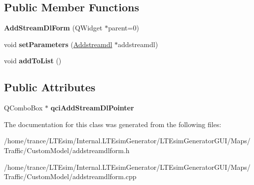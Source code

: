 \subsection*{Public Member Functions}
\begin{DoxyCompactItemize}
\item 
{\bfseries Add\+Stream\+Dl\+Form} (Q\+Widget $\ast$parent=0)\hypertarget{class_add_stream_dl_form_afa2a85a80f61b04969d082ffef72b9f1}{}\label{class_add_stream_dl_form_afa2a85a80f61b04969d082ffef72b9f1}

\item 
void {\bfseries set\+Parameters} (\hyperlink{class_addstreamdl}{Addstreamdl} $\ast$addstreamdl)\hypertarget{class_add_stream_dl_form_a182d398de3c7aa2993fc536286c7623b}{}\label{class_add_stream_dl_form_a182d398de3c7aa2993fc536286c7623b}

\item 
void {\bfseries add\+To\+List} ()\hypertarget{class_add_stream_dl_form_a15cc2397367ff0fca3631b2c558a7ff7}{}\label{class_add_stream_dl_form_a15cc2397367ff0fca3631b2c558a7ff7}

\end{DoxyCompactItemize}
\subsection*{Public Attributes}
\begin{DoxyCompactItemize}
\item 
Q\+Combo\+Box $\ast$ {\bfseries qci\+Add\+Stream\+Dl\+Pointer}\hypertarget{class_add_stream_dl_form_a8820b6721a1a8f0790085c0fade5421a}{}\label{class_add_stream_dl_form_a8820b6721a1a8f0790085c0fade5421a}

\end{DoxyCompactItemize}


The documentation for this class was generated from the following files\+:\begin{DoxyCompactItemize}
\item 
/home/trance/\+L\+T\+Esim/\+Internal.\+L\+T\+Esim\+Generator/\+L\+T\+Esim\+Generator\+G\+U\+I/\+Maps/\+Traffic/\+Custom\+Model/addstreamdlform.\+h\item 
/home/trance/\+L\+T\+Esim/\+Internal.\+L\+T\+Esim\+Generator/\+L\+T\+Esim\+Generator\+G\+U\+I/\+Maps/\+Traffic/\+Custom\+Model/addstreamdlform.\+cpp\end{DoxyCompactItemize}
